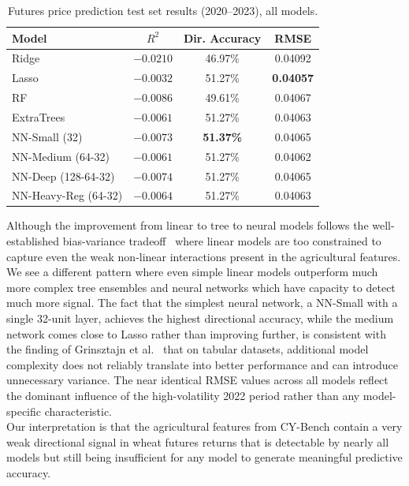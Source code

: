 \documentclass[pdflatex,sn-mathphys-num, oneside, 11pt]{sn-jnl}%
\theoremstyle{thmstyleone}%
\theoremstyle{thmstyletwo}%
\theoremstyle{thmstylethree}%
\begin{document}
\begin{table}[ht!]
\centering
\caption{Futures price prediction test set results (2020--2023), all models.}
\label{tab:futures_comparison}
\setlength{\tabcolsep}{12pt}
\begin{tabular}{lccc}
\toprule
\textbf{Model} & \textbf{$R^2$} & \textbf{Dir. Accuracy} & \textbf{RMSE} \\
\midrule
Ridge                  & $-0.0210$ & 46.97\% & 0.04092 \\
Lasso                  & $\mathbf{-0.0032}$ & 51.27\% & \textbf{0.04057} \\
RF                     & $-0.0086$ & 49.61\% & 0.04067 \\
ExtraTrees             & $-0.0061$ & 51.27\% & 0.04063 \\
\midrule
NN-Small (32)          & $-0.0073$ & \textbf{51.37\%} & 0.04065 \\
NN-Medium (64-32)      & $-0.0061$ & 51.27\% & 0.04062 \\
NN-Deep (128-64-32)    & $-0.0074$ & 51.27\% & 0.04065 \\
NN-Heavy-Reg (64-32)   & $-0.0064$ & 51.27\% & 0.04063 \\
\bottomrule
\end{tabular}
\end{table}
Although the improvement from linear to tree to neural models follows the well-established bias-variance tradeoff~\cite{bib36} where linear models are too constrained to capture even the weak non-linear interactions present in the agricultural features. We see a different pattern where even simple linear models outperform much more complex tree ensembles and neural networks which have capacity to detect much more signal. The fact that the simplest neural network, a NN-Small with a single 32-unit layer, achieves the highest directional accuracy, while the medium network comes close to Lasso rather than improving further, is consistent with the finding of Grinsztajn et al.~\cite{bib27} that on tabular datasets, additional model complexity does not reliably translate into better performance and can introduce unnecessary variance. The near identical RMSE values across all models reflect the dominant influence of the high-volatility 2022 period rather than any model-specific characteristic.\\

Our interpretation is that the agricultural features from CY-Bench contain a very weak directional signal in wheat futures returns that is detectable by nearly all models but still being insufficient for any model to generate meaningful predictive accuracy.\\ 
\end{document}
